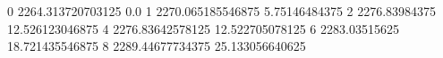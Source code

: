 0 2264.313720703125 0.0
1 2270.065185546875 5.75146484375
2 2276.83984375 12.526123046875
4 2276.83642578125 12.522705078125
6 2283.03515625 18.721435546875
8 2289.44677734375 25.133056640625
